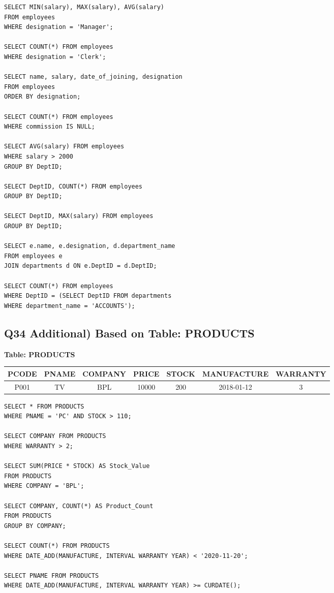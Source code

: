\documentclass{article}
\begin{document}
\begin{lstlisting}
SELECT MIN(salary), MAX(salary), AVG(salary) 
FROM employees 
WHERE designation = 'Manager';

SELECT COUNT(*) FROM employees 
WHERE designation = 'Clerk';

SELECT name, salary, date_of_joining, designation 
FROM employees 
ORDER BY designation;

SELECT COUNT(*) FROM employees 
WHERE commission IS NULL;

SELECT AVG(salary) FROM employees 
WHERE salary > 2000 
GROUP BY DeptID;

SELECT DeptID, COUNT(*) FROM employees 
GROUP BY DeptID;

SELECT DeptID, MAX(salary) FROM employees 
GROUP BY DeptID;

SELECT e.name, e.designation, d.department_name 
FROM employees e 
JOIN departments d ON e.DeptID = d.DeptID;

SELECT COUNT(*) FROM employees 
WHERE DeptID = (SELECT DeptID FROM departments 
WHERE department_name = 'ACCOUNTS');
\end{lstlisting}

\subsection*{Q34 Additional) Based on Table: PRODUCTS}

\textbf{Table: PRODUCTS}
\begin{center}
\begin{tabular}{|c|c|c|c|c|c|c|}
\hline
PCODE & PNAME & COMPANY & PRICE & STOCK & MANUFACTURE & WARRANTY \\
\hline
P001 & TV & BPL & 10000 & 200 & 2018-01-12 & 3 \\
\hline
\end{tabular}
\end{center}

\begin{lstlisting}
SELECT * FROM PRODUCTS 
WHERE PNAME = 'PC' AND STOCK > 110;

SELECT COMPANY FROM PRODUCTS 
WHERE WARRANTY > 2;

SELECT SUM(PRICE * STOCK) AS Stock_Value 
FROM PRODUCTS 
WHERE COMPANY = 'BPL';

SELECT COMPANY, COUNT(*) AS Product_Count 
FROM PRODUCTS 
GROUP BY COMPANY;

SELECT COUNT(*) FROM PRODUCTS 
WHERE DATE_ADD(MANUFACTURE, INTERVAL WARRANTY YEAR) < '2020-11-20';

SELECT PNAME FROM PRODUCTS 
WHERE DATE_ADD(MANUFACTURE, INTERVAL WARRANTY YEAR) >= CURDATE();
\end{lstlisting}
\end{document}
